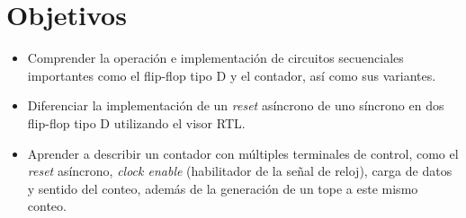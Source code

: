 \section{Objetivos \label{sec:obj}}


\begin{itemize} 
	\item Comprender la operación e implementación de circuitos secuenciales importantes como el flip-flop tipo D y el contador, así como sus variantes.
	
	\item Diferenciar la implementación de un \textit{reset} asíncrono de uno síncrono en dos flip-flop tipo D utilizando el visor RTL.
	
	\item Aprender a describir un contador con múltiples terminales de control, como el \textit{reset} asíncrono, \textit{clock enable} (habilitador de la señal de reloj), carga de datos y sentido del conteo, además de la generación de un tope a este mismo conteo.
\end{itemize}
